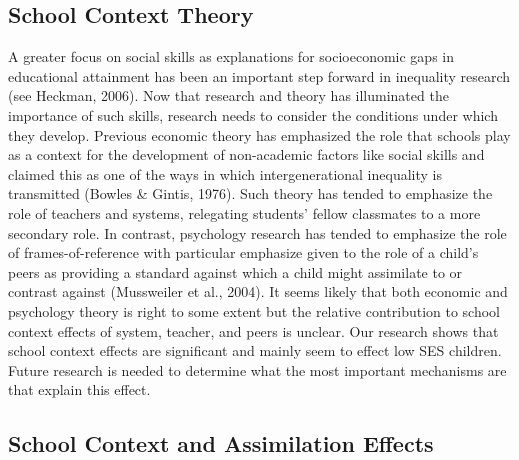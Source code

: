 \documentclass[
  english,
  man]{apa6}
\begin{document}
\hypertarget{school-context-theory}{%
\subsection{School Context Theory}\label{school-context-theory}}

A greater focus on social skills as explanations for socioeconomic gaps in educational attainment has been an important step forward in inequality research (see Heckman, 2006). Now that research and theory has illuminated the importance of such skills, research needs to consider the conditions under which they develop. Previous economic theory has emphasized the role that schools play as a context for the development of non-academic factors like social skills and claimed this as one of the ways in which intergenerational inequality is transmitted (Bowles \& Gintis, 1976). Such theory has tended to emphasize the role of teachers and systems, relegating students' fellow classmates to a more secondary role. In contrast, psychology research has tended to emphasize the role of frames-of-reference with particular emphasize given to the role of a child's peers as providing a standard against which a child might assimilate to or contrast against (Mussweiler et al., 2004). It seems likely that both economic and psychology theory is right to some extent but the relative contribution to school context effects of system, teacher, and peers is unclear. Our research shows that school context effects are significant and mainly seem to effect low SES children. Future research is needed to determine what the most important mechanisms are that explain this effect.

\hypertarget{school-context-and-assimilation-effects}{%
\subsection{School Context and Assimilation Effects}\label{school-context-and-assimilation-effects}}
\end{document}
